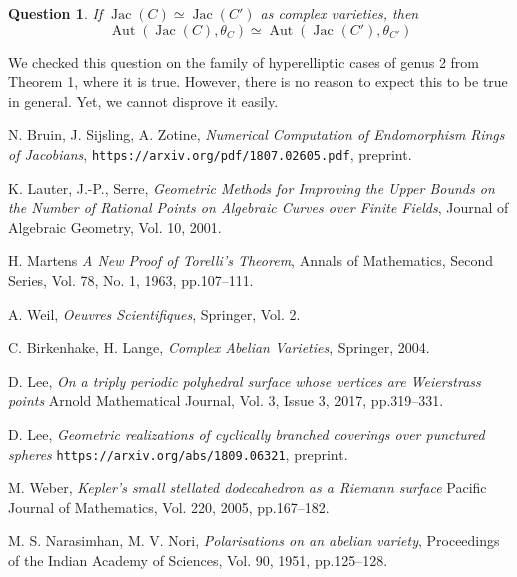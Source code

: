 \documentclass[12pt,reqno]{amsart}
\DeclareMathOperator{\Aut}{Aut}
\DeclareMathOperator{\Jac}{Jac}
\newtheorem*{question}{Question}
\theoremstyle{definition}
\theoremstyle{remark}
\begin{document}
\begin{question} If $\Jac(C) \simeq \Jac(C')$ as complex varieties, then $$\Aut(\Jac(C), \theta_C) \simeq \Aut(\Jac(C'), \theta_{C'})$$  \end{question} 

We checked this question on the family of hyperelliptic cases of genus 2 from \cite{howe1} Theorem 1, where it is true. However, there is no reason to expect this to be true in general. Yet, we cannot disprove it easily. 



\begin{thebibliography}{9}

N. Bruin, J. Sijsling, A. Zotine,
\textit{Numerical Computation of Endomorphism Rings of Jacobians},
\texttt{https://arxiv.org/pdf/1807.02605.pdf}, preprint.

K. Lauter, J.-P., Serre, 
\textit{Geometric Methods for Improving the Upper Bounds on the Number of Rational Points on Algebraic Curves over Finite Fields}, 
Journal of Algebraic Geometry,
Vol. 10, 2001.


H. Martens
\textit{A New Proof of Torelli's Theorem},
Annals of Mathematics,
Second Series, Vol. 78, No. 1, 1963, pp.107--111.

A. Weil,
\textit{Oeuvres Scientifiques},
Springer,
Vol. 2. 


C. Birkenhake, H. Lange, 
\textit{Complex Abelian Varieties},
Springer, 2004.


D. Lee,
\textit{On a triply periodic polyhedral surface whose vertices are Weierstrass points}
Arnold Mathematical Journal, 
Vol. 3, Issue 3, 2017, pp.319--331.

D. Lee, 
\textit{Geometric realizations of cyclically branched coverings over punctured spheres}
\texttt{https://arxiv.org/abs/1809.06321}, preprint.


M. Weber,
\textit{Kepler's small stellated dodecahedron as a Riemann surface}
Pacific Journal of Mathematics, 
Vol. 220, 2005, pp.167--182.







M. S. Narasimhan, M. V. Nori,
\textit{Polarisations on an abelian variety},
Proceedings of the Indian Academy of Sciences,
Vol. 90, 1951, pp.125--128.





\end{thebibliography}
\end{document}
